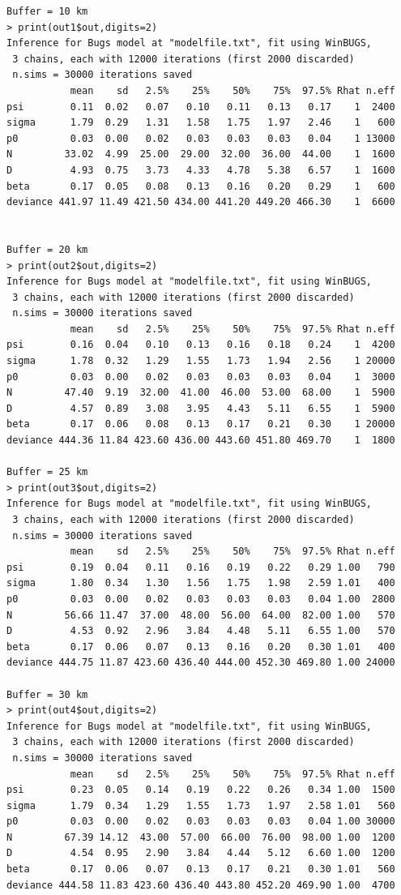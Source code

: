 {\small
\begin{verbatim}
Buffer = 10 km
> print(out1$out,digits=2)
Inference for Bugs model at "modelfile.txt", fit using WinBUGS,
 3 chains, each with 12000 iterations (first 2000 discarded)
 n.sims = 30000 iterations saved
           mean    sd   2.5%    25%    50%    75%  97.5% Rhat n.eff
psi        0.11  0.02   0.07   0.10   0.11   0.13   0.17    1  2400
sigma      1.79  0.29   1.31   1.58   1.75   1.97   2.46    1   600
p0         0.03  0.00   0.02   0.03   0.03   0.03   0.04    1 13000
N         33.02  4.99  25.00  29.00  32.00  36.00  44.00    1  1600
D          4.93  0.75   3.73   4.33   4.78   5.38   6.57    1  1600
beta       0.17  0.05   0.08   0.13   0.16   0.20   0.29    1   600
deviance 441.97 11.49 421.50 434.00 441.20 449.20 466.30    1  6600


Buffer = 20 km
> print(out2$out,digits=2)
Inference for Bugs model at "modelfile.txt", fit using WinBUGS,
 3 chains, each with 12000 iterations (first 2000 discarded)
 n.sims = 30000 iterations saved
           mean    sd   2.5%    25%    50%    75%  97.5% Rhat n.eff
psi        0.16  0.04   0.10   0.13   0.16   0.18   0.24    1  4200
sigma      1.78  0.32   1.29   1.55   1.73   1.94   2.56    1 20000
p0         0.03  0.00   0.02   0.03   0.03   0.03   0.04    1  3000
N         47.40  9.19  32.00  41.00  46.00  53.00  68.00    1  5900
D          4.57  0.89   3.08   3.95   4.43   5.11   6.55    1  5900
beta       0.17  0.06   0.08   0.13   0.17   0.21   0.30    1 20000
deviance 444.36 11.84 423.60 436.00 443.60 451.80 469.70    1  1800

Buffer = 25 km
> print(out3$out,digits=2)
Inference for Bugs model at "modelfile.txt", fit using WinBUGS,
 3 chains, each with 12000 iterations (first 2000 discarded)
 n.sims = 30000 iterations saved
           mean    sd   2.5%    25%    50%    75%  97.5% Rhat n.eff
psi        0.19  0.04   0.11   0.16   0.19   0.22   0.29 1.00   790
sigma      1.80  0.34   1.30   1.56   1.75   1.98   2.59 1.01   400
p0         0.03  0.00   0.02   0.03   0.03   0.03   0.04 1.00  2800
N         56.66 11.47  37.00  48.00  56.00  64.00  82.00 1.00   570
D          4.53  0.92   2.96   3.84   4.48   5.11   6.55 1.00   570
beta       0.17  0.06   0.07   0.13   0.16   0.20   0.30 1.01   400
deviance 444.75 11.87 423.60 436.40 444.00 452.30 469.80 1.00 24000

Buffer = 30 km
> print(out4$out,digits=2)
Inference for Bugs model at "modelfile.txt", fit using WinBUGS,
 3 chains, each with 12000 iterations (first 2000 discarded)
 n.sims = 30000 iterations saved
           mean    sd   2.5%    25%    50%    75%  97.5% Rhat n.eff
psi        0.23  0.05   0.14   0.19   0.22   0.26   0.34 1.00  1500
sigma      1.79  0.34   1.29   1.55   1.73   1.97   2.58 1.01   560
p0         0.03  0.00   0.02   0.03   0.03   0.03   0.04 1.00 30000
N         67.39 14.12  43.00  57.00  66.00  76.00  98.00 1.00  1200
D          4.54  0.95   2.90   3.84   4.44   5.12   6.60 1.00  1200
beta       0.17  0.06   0.07   0.13   0.17   0.21   0.30 1.01   560
deviance 444.58 11.83 423.60 436.40 443.80 452.20 469.90 1.00  4700


\end{verbatim}}
